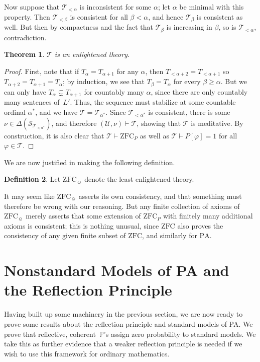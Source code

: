 \documentclass[12pt]{article}
\newcommand{\PP}{\mathbb{P}}
\newcommand{\vp}{\varphi}
\newcommand{\zfc}{\mathrm{ZFC}}
\newcommand{\zfcp}{{\zfc_P}}
\newcommand{\zfch}{{\zfc_{\smiley}}}
\newcommand{\pa}{\mathrm{PA}}
\newcommand{\cL}{L'}
\newcommand{\cS}{\mathcal{S}}
\newcommand{\cT}{\mathcal{T}}
\newcommand{\cU}{\mathcal{U}}
\theoremstyle{plain}
\newtheorem{theorem}{Theorem}[subsection]
\theoremstyle{definition}
\newtheorem{definition}[theorem]{Definition}
\theoremstyle{remark}
\begin{document}
Now suppose that $\cT_{<\alpha}$ is inconsistent for some $\alpha$; let $\alpha$ be minimal with this property. Then $\cT_{<\beta}$ is consistent for all $\beta<\alpha$, and hence $\cT_\beta$ is consistent as well. But then by compactness and the fact that $\cT_\beta$ is increasing in $\beta$, so is $\cT_{<\alpha}$, contradiction.
\begin{theorem}
$\cT$ is an enlightened theory.
\end{theorem}
\begin{proof}
First, note that if $T_{\alpha}= T_{\alpha+1}$ for any $\alpha$, then $T_{<\alpha+2} = T_{<\alpha+1}$ so $T_{\alpha+2} = T_{\alpha+1} = T_\alpha$; by induction, we see that $T_\beta = T_\alpha$ for every $\beta\ge\alpha$. But we can only have $T_{\alpha}\subsetneq T_{\alpha+1}$ for countably many $\alpha$, since there are only countably many sentences of~$\cL$. Thus, the sequence must stabilize at some countable ordinal $\alpha^*$, and we have $\cT = \cT_{\alpha^*}$. Since $\cT_{<\alpha^*}$ is consistent, there is some $\nu\in\Delta(\cS_{\cT_{<\alpha^*}})$, and therefore $(\cU,\nu)\vdash\cT$, showing that $\cT$ is meditative. By construction, it is also clear that $\cT\vdash\zfcp$ as well as $\cT\vdash P[\vp]=1$ for all $\vp\in\cT$.
\end{proof}
We are now justified in making the following definition.
\begin{definition}
Let $\zfch$ denote the least enlightened theory.
\end{definition}
It may seem like $\zfch$ asserts its own consistency, and that something must therefore be wrong with our reasoning. But any finite collection of axioms of $\zfch$ merely asserts that some extension of $\zfcp$ with finitely many additional axioms is consistent; this is nothing unusual, since $\zfc$ also proves the consistency of any given finite subset of $\zfc$, and similarly for $\pa$.
\section{Nonstandard Models of PA and the Reflection Principle}
\label{nonstandard-models}
Having built up some machinery in the previous section, we are now ready to prove some results about the reflection principle and standard models of PA. We prove that reflective, coherent~$\PP$'s  assign zero probability to standard models. We take this as further evidence that a weaker reflection principle is needed if we wish to use this framework for ordinary mathematics.
\end{document}
